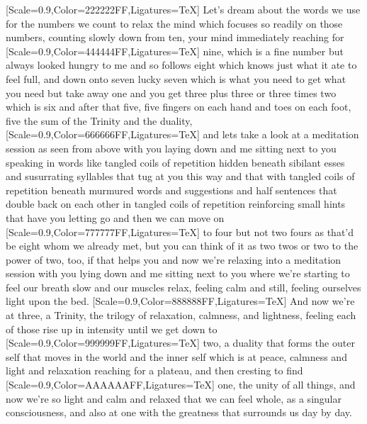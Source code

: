 {\large{}[Scale=0.9,Color=222222FF,Ligatures=TeX] Let's dream about the words we use for the numbers we count to relax the mind which focuses so readily on those numbers, counting slowly down from ten, your mind immediately reaching for}
{\normalsize{}[Scale=0.9,Color=444444FF,Ligatures=TeX] nine, which is a fine number but always looked hungry to me and so follows eight which knows just what it ate to feel full, and down onto seven lucky seven which is what you need to get what you need but take away one and you get three plus three or three times two which is six and after that five, five fingers on each hand and toes on each foot, five the sum of the Trinity and the duality,}
{[Scale=0.9,Color=666666FF,Ligatures=TeX] and lets take a look at a meditation session as seen from above with you laying down and me sitting next to you
speaking in words like tangled coils of repetition hidden beneath sibilant esses and susurrating syllables that tug at you this way and that with tangled coils of repetition beneath murmured words and suggestions and half sentences that double back on each other in tangled coils of repetition reinforcing small hints that have you letting go and then we can move on}
{\small{}[Scale=0.9,Color=777777FF,Ligatures=TeX] to four but not two fours as that'd be eight whom we already met, but you can think of it as two twos or two to the power of two, too, if that helps you and now we're relaxing into a meditation session with you lying down and me sitting next to you where we're starting to feel our breath slow and our muscles relax, feeling calm and still, feeling ourselves light upon the bed.}
{\footnotesize{}[Scale=0.9,Color=888888FF,Ligatures=TeX] And now we're at three, a Trinity, the trilogy of relaxation, calmness, and lightness, feeling each of those rise up in intensity until we get down to}
{\scriptsize{}[Scale=0.9,Color=999999FF,Ligatures=TeX] two, a duality that forms the outer self that moves in the world and the inner self which is at peace, calmness and light and relaxation reaching for a plateau, and then cresting to find}
{\tiny{}[Scale=0.9,Color=AAAAAAFF,Ligatures=TeX] one, the unity of all things, and now we're so light and calm and relaxed that we can feel whole, as a singular consciousness, and also at one with the greatness that surrounds us day by day.}
